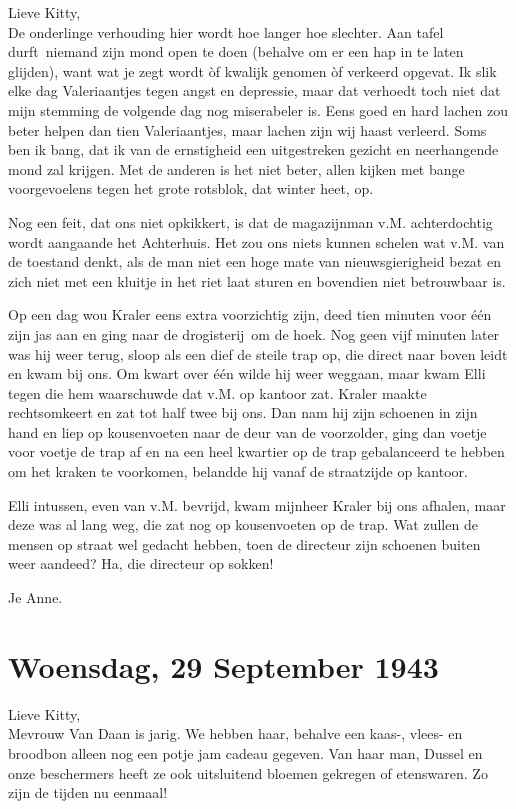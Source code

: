 \documentclass{book}
\begin{document}
Lieve Kitty,\\
De onderlinge verhouding hier wordt hoe langer hoe slechter. Aan
tafel durft~niemand zijn mond open te doen (behalve om er een hap in te laten
glijden), want wat je zegt wordt òf kwalijk genomen òf verkeerd opgevat. Ik slik
elke dag Valeriaantjes tegen angst en depressie, maar dat verhoedt toch niet dat
mijn stemming de volgende dag nog miserabeler is. Eens goed en hard lachen zou
beter helpen dan tien Valeriaantjes, maar lachen zijn wij haast verleerd. Soms
ben ik bang, dat ik van de ernstigheid een uitgestreken gezicht en neerhangende
mond zal krijgen. Met de anderen is het niet beter, allen kijken met bange
voorgevoelens tegen het grote rotsblok, dat winter heet, op.

Nog een feit, dat ons niet opkikkert, is dat de magazijnman v.M.  achterdochtig
wordt aangaande het Achterhuis. Het zou ons niets kunnen schelen wat v.M. van de
toestand denkt, als de man niet een hoge mate van nieuwsgierigheid bezat en zich
niet met een kluitje in het riet laat sturen en bovendien niet betrouwbaar is.

Op een dag wou Kraler eens extra voorzichtig zijn, deed tien minuten voor één
zijn jas aan en ging naar de drogisterij~om de hoek. Nog geen vijf minuten later
was hij weer terug, sloop als een dief de steile trap op, die direct naar boven
leidt en kwam bij ons. Om kwart over één wilde hij weer weggaan, maar kwam Elli
tegen die hem waarschuwde dat v.M. op kantoor zat. Kraler maakte rechtsomkeert
en zat tot half twee bij ons.  Dan nam hij zijn schoenen in zijn hand en liep op
kousenvoeten naar de deur van de voorzolder, ging dan voetje voor voetje de trap
af en na een heel kwartier op de trap gebalanceerd te hebben om het kraken te
voorkomen, belandde hij vanaf de straatzijde op kantoor.

Elli intussen, even van v.M. bevrijd, kwam mijnheer Kraler bij ons afhalen, maar
deze was al lang weg, die zat nog op kousenvoeten op de trap. Wat zullen de
mensen op straat wel gedacht hebben, toen de directeur zijn schoenen buiten weer
aandeed? Ha, die directeur op sokken!

Je Anne.

\section*{Woensdag, 29 September 1943}

Lieve Kitty,\\
Mevrouw Van Daan is jarig. We hebben haar, behalve een kaas-,
vlees- en broodbon alleen nog een potje jam cadeau gegeven. Van haar man, Dussel
en onze beschermers heeft ze ook uitsluitend bloemen gekregen of etenswaren. Zo
zijn de tijden nu eenmaal!
\end{document}
